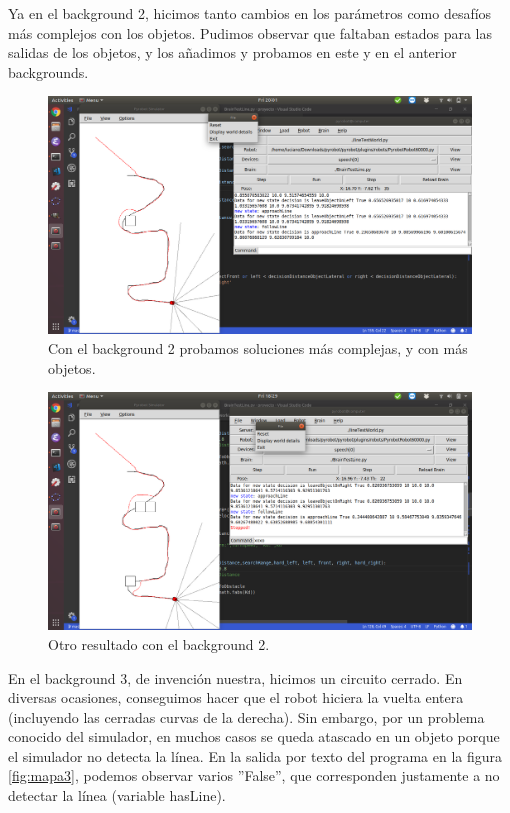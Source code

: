 \documentclass{article}
\begin{document}
Ya en el background 2, hicimos tanto cambios en los parámetros como desafíos más complejos con los objetos. Pudimos observar que faltaban estados para las salidas de los objetos, y los añadimos y probamos en este y en el anterior backgrounds.

\begin{figure}[H]
    \centering
    \includegraphics[width=12cm]{mapa2_1.png}
    \caption{Con el background 2 probamos soluciones más complejas, y con más objetos.}
    \label{fig:mapa2}
\end{figure}

\begin{figure}[H]
    \centering
    \includegraphics[width=12cm]{mapa2.png}
    \caption{Otro resultado con el background 2.}
    \label{fig:mapa2_1}
\end{figure}

En el background 3, de invención nuestra, hicimos un circuito cerrado. En diversas ocasiones, conseguimos hacer que el robot hiciera la vuelta entera (incluyendo las cerradas curvas de la derecha). Sin embargo, por un problema conocido del simulador, en muchos casos se queda atascado en un objeto porque el simulador no detecta la línea. En la salida por texto del programa en la figura \ref{fig:mapa3}, podemos observar varios ''False'', que corresponden justamente a no detectar la línea (variable hasLine).
\end{document}
